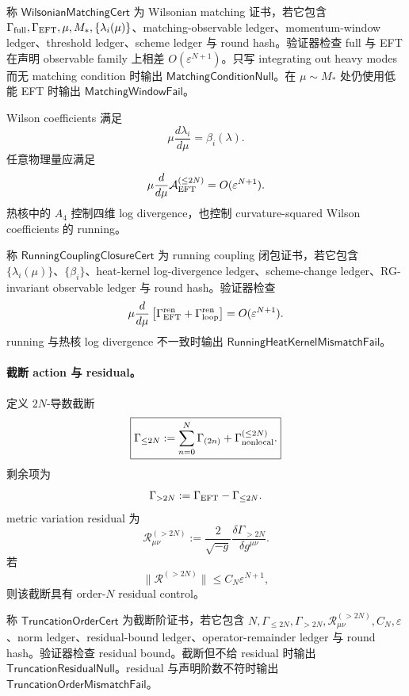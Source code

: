 \begin{definition}\label{def:typed-address-biaxial-completion-wilsonian-matching-cert}
称 \(\mathsf{WilsonianMatchingCert}\) 为 Wilsonian matching 证书，若它包含 \(\Gamma_{\rm full},\Gamma_{\rm EFT},\mu,M_*,\{\lambda_i(\mu)\}\)、matching-observable ledger、momentum-window ledger、threshold ledger、scheme ledger 与 round hash。验证器检查 full 与 EFT 在声明 observable family 上相差 \(O(\varepsilon^{N+1})\)。只写 integrating out heavy modes 而无 matching condition 时输出 \(\mathsf{MatchingConditionNull}\)。在 \(\mu\sim M_*\) 处仍使用低能 EFT 时输出 \(\mathsf{MatchingWindowFail}\)。
\end{definition}

Wilson coefficients 满足
\[
\mu\frac{d\lambda_i}{d\mu}=\beta_i(\lambda).
\]
任意物理量应满足
\[
\mu\frac{d}{d\mu}\mathcal A_{\rm EFT}^{(\le2N)}
=
O(\varepsilon^{N+1}).
\]
热核中的 \(A_4\) 控制四维 log divergence，也控制 curvature-squared Wilson coefficients 的 running。

\begin{definition}\label{def:typed-address-biaxial-completion-running-coupling-closure-cert}
称 \(\mathsf{RunningCouplingClosureCert}\) 为 running coupling 闭包证书，若它包含 \(\{\lambda_i(\mu)\}\)、\(\{\beta_i\}\)、heat-kernel log-divergence ledger、scheme-change ledger、RG-invariant observable ledger 与 round hash。验证器检查
\[
\mu\frac{d}{d\mu}
\left[
\Gamma_{\rm EFT}^{\rm ren}
+
\Gamma_{\rm loop}^{\rm ren}
\right]
=
O(\varepsilon^{N+1}).
\]
running 与热核 log divergence 不一致时输出 \(\mathsf{RunningHeatKernelMismatchFail}\)。
\end{definition}

\paragraph{截断 action 与 residual。}
定义 \(2N\)-导数截断
\[
\boxed{
\Gamma_{\le2N}
:=
\sum_{n=0}^{N}\Gamma_{(2n)}
+
\Gamma_{\rm nonlocal}^{(\le2N)}.
}
\]
剩余项为
\[
\Gamma_{>2N}:=\Gamma_{\rm EFT}-\Gamma_{\le2N}.
\]
metric variation residual 为
\[
\boxed{
\mathcal R_{\mu\nu}^{(>2N)}
:=
\frac{2}{\sqrt{-g}}
\frac{\delta\Gamma_{>2N}}{\delta g^{\mu\nu}}.
}
\]
若
\[
\|\mathcal R^{(>2N)}\|\le C_N\varepsilon^{N+1},
\]
则该截断具有 order-\(N\) residual control。

\begin{definition}[截断阶证书]\label{def:typed-address-biaxial-completion-truncation-order-cert}
称 \(\mathsf{TruncationOrderCert}\) 为截断阶证书，若它包含 \(N,\Gamma_{\le2N},\Gamma_{>2N},\mathcal R_{\mu\nu}^{(>2N)},C_N,\varepsilon\)、norm ledger、residual-bound ledger、operator-remainder ledger 与 round hash。验证器检查 residual bound。截断但不给 residual 时输出 \(\mathsf{TruncationResidualNull}\)。residual 与声明阶数不符时输出 \(\mathsf{TruncationOrderMismatchFail}\)。
\end{definition}


